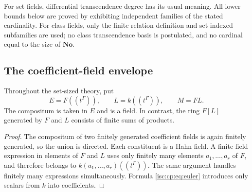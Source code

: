 \documentclass[11pt,letterpaper]{article}
\newtheorem{lemma}[theorem]{Lemma}
\theoremstyle{definition}
\newtheorem{definition}[theorem]{Definition}
\theoremstyle{remark}
\newcommand{\No}{\mathbf{No}}
\newcommand{\Cfg}{\mathcal C_{\mathrm{fg}}}
\newcommand{\jet}{\mathcal J}
\numberwithin{equation}{section}
\begin{document}

For set fields, differential transcendence degree has its usual meaning.
All lower bounds below are proved by exhibiting independent families of the
stated cardinality. For class fields, only the finite-relation definition
and set-indexed subfamilies are used; no class transcendence basis is
postulated, and no cardinal equal to the size of $\No$.

\subsection{The coefficient-field envelope}

Throughout the set-sized theory, put
\begin{equation}\label{isc:cp:eq:basicfields}
 E=F((t^\Gamma)),\qquad L=k((t^\Gamma)),\qquad M=FL.
\end{equation}
The compositum is taken in $E$ and is a field. In contrast, the ring
$F[L]$ generated by $F$ and $L$ consists of finite sums of products.


\begin{proof}
The compositum of two finitely generated coefficient fields is again
finitely generated, so the union is directed. Each constituent is a Hahn
field. A finite field expression in elements of $F$ and $L$ uses only
finitely many elements $a_1,\ldots,a_r$ of $F$, and therefore belongs to
$k(a_1,\ldots,a_r)((t^\Gamma))$. The same argument handles finitely many
expressions simultaneously. Formula \eqref{isc:cp:eq:euler} introduces only
scalars from $k$ into coefficients.
\end{proof}
\end{document}
